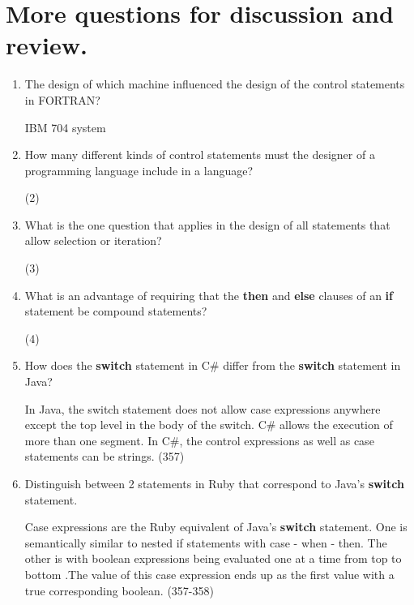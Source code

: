 \section{More questions for discussion and review.}

\begin{enumerate}
  \item The design of which machine influenced the design
    of the control statements in FORTRAN?
    
 \begin{answer}
    IBM 704 system 
     \end{answer}

  \item How many different kinds of control statements
    must the designer of a programming language include
    in a language?

 \begin{answer}
    (2)
 \end{answer}
 
  \item What is the one question that applies in the
    design of all statements that allow selection or
    iteration?

 \begin{answer}
    (3)
 \end{answer}
 
  \item What is an advantage of requiring that
    the \textbf{then} and \textbf{else} clauses of
    an \textbf{if} statement be compound statements?

 \begin{answer}
    (4)
 \end{answer}
 
  \item How does the \textbf{switch} statement in C\#
    differ from the \textbf{switch} statement in Java?

 \begin{answer}
   In Java, the switch statement does not allow case expressions anywhere except the top level in the body of the switch.  C\#  allows the execution of more than one segment. In C\#, the control expressions as well as case statements can be strings. (357)
 \end{answer}
 
  \item Distinguish between 2 statements in Ruby
    that correspond to Java's \textbf{switch} statement.

 \begin{answer}
    Case expressions are the Ruby equivalent of Java's \textbf{switch} statement. One is semantically similar to nested if statements with case - when - then. The other is with boolean expressions being evaluated one at a time from top to bottom .The value of this case expression ends up as the first value with a true corresponding boolean. (357-358)
     \end{answer}


\end{enumerate}
